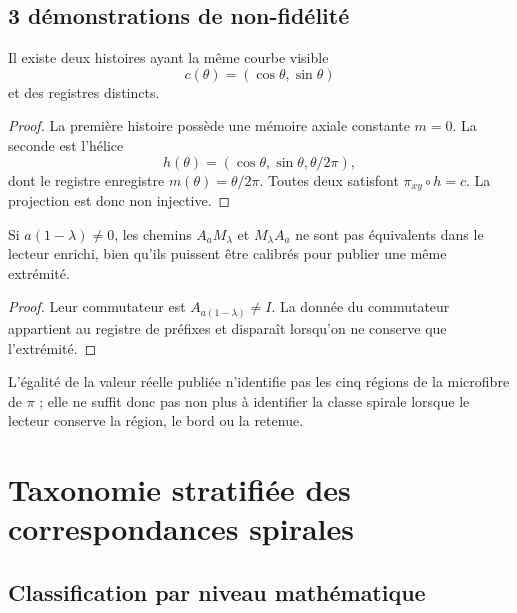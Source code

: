 \section{3 démonstrations de non-fidélité}

\begin{proposition}
Il existe deux histoires ayant la même courbe visible
\[
 c(\theta)=(\cos\theta,\sin\theta)
\]
et des registres distincts.
\end{proposition}
\begin{proof}
La première histoire possède une mémoire axiale constante \(m=0\). La seconde est l'hélice
\[
 h(\theta)=(\cos\theta,\sin\theta,\theta/2\pi),
\]
dont le registre enregistre \(m(\theta)=\theta/2\pi\). Toutes deux satisfont \(\pi_{xy}\circ h=c\). La projection est donc non injective.
\end{proof}

\begin{proposition}
Si \(a(1-\lambda)\neq0\), les chemins \(A_aM_\lambda\) et \(M_\lambda A_a\) ne sont pas équivalents dans le lecteur enrichi, bien qu'ils puissent être calibrés pour publier une même extrémité.
\end{proposition}
\begin{proof}
Leur commutateur est \(A_{a(1-\lambda)}\neq I\). La donnée du commutateur appartient au registre de préfixes et disparaît lorsqu'on ne conserve que l'extrémité.
\end{proof}

\begin{proposition}
L'égalité de la valeur réelle publiée n'identifie pas les cinq régions de la microfibre de \(\pi\) ; elle ne suffit donc pas non plus à identifier la classe spirale lorsque le lecteur conserve la région, le bord ou la retenue.
\end{proposition}

\chapter{Taxonomie stratifiée des correspondances spirales}

\section{Classification par niveau mathématique}


